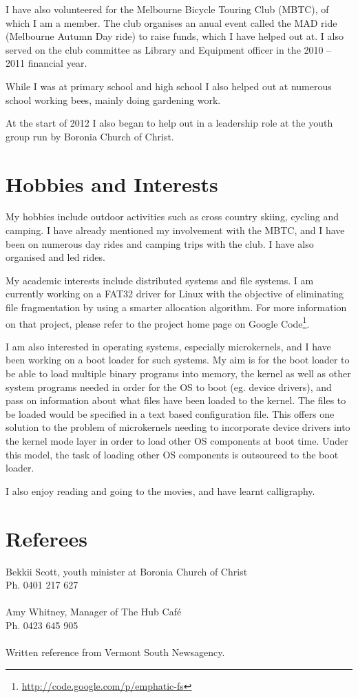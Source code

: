 \documentclass[a4paper]{article}
\begin{document}
I have also volunteered for the Melbourne Bicycle Touring Club (MBTC), of
which I am a member. The club organises an anual event called the MAD ride
(Melbourne Autumn Day ride) to raise funds, which I have helped out at. I
also served on the club committee as Library and Equipment officer in the
2010 -- 2011 financial year.

While I was at primary school and high school I also helped out at
numerous school working bees, mainly doing gardening work.

At the start of 2012 I also began to help out in a leadership role at the
youth group run by Boronia Church of Christ.


\section{Hobbies and Interests}
My hobbies include outdoor activities such as cross country skiing, cycling
and camping. I have already mentioned my involvement with the MBTC, and I
have been on numerous day rides and camping trips with the club. I have
also organised and led rides.

My academic interests include distributed systems and file systems. I am
currently working on a FAT32 driver for Linux with the objective of
eliminating file fragmentation by using a smarter allocation algorithm.
For more information on that project, please refer to the project home
page on Google Code\footnote{
\href{http://code.google.com/p/emphatic-fs}{http://code.google.com/p/emphatic-fs}
}.

I am also interested in operating systems, especially microkernels, and I
have been working on a boot loader for such systems. My aim is for the
boot loader to be able to load multiple binary programs into memory, the
kernel as well as other system programs needed in order for the OS to
boot (eg. device drivers), and pass on information about what files
have been loaded to the kernel. The files to be loaded would be specified 
in a text based configuration file. This offers one solution to the problem 
of microkernels needing to incorporate device drivers into the kernel mode 
layer in order to load other OS components at boot time. Under this model, 
the task of loading other OS components is outsourced to the boot loader.

I also enjoy reading and going to the movies, and have learnt calligraphy.



\section{Referees}
Bekkii Scott, youth minister at Boronia Church of Christ \\
Ph. 0401 217 627\\ \\
Amy Whitney, Manager of The Hub Caf\'e \\
Ph. 0423 645 905\\ \\
Written reference from Vermont South Newsagency.

\end{document}
